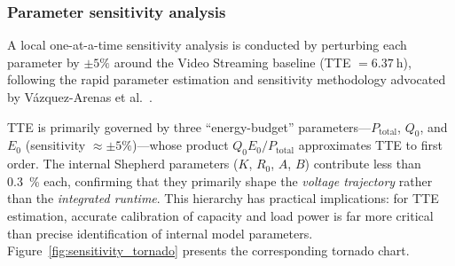 \documentclass[5p,times,number]{elsarticle}
\newcommand{\figref}[1]{\textcolor{supercolor}{Figure~\ref{#1}}}
\begin{document}
\subsubsection{Parameter sensitivity analysis}\label{sec:sensitivity}
A local one-at-a-time sensitivity analysis is conducted by perturbing each parameter by $\pm 5\%$ around the Video Streaming baseline (TTE $= \SI{6.37}{\hour}$), following the rapid parameter estimation and sensitivity methodology advocated by V\'{a}zquez-Arenas et al.~\cite{VazquezArenas2014ECM}.
\begin{table}[!tb]
\caption{Parameter sensitivity ($\pm 5\%$ perturbation, Video Streaming).}\label{tab:sensitivity}
\centering
{}
\end{table}
TTE is primarily governed by three ``energy-budget'' parameters---$P_{\mathrm{total}}$, $Q_0$, and $E_0$ (sensitivity $\approx \pm 5\%$)---whose product $Q_0 E_0 / P_{\mathrm{total}}$ approximates TTE to first order.
The internal Shepherd parameters ($K$, $R_0$, $A$, $B$) contribute less than \SI{0.3}{\percent} each, confirming that they primarily shape the \emph{voltage trajectory} rather than the \emph{integrated runtime}.
This hierarchy has practical implications: for TTE estimation, accurate calibration of capacity and load power is far more critical than precise identification of internal model parameters.
\figref{fig:sensitivity_tornado} presents the corresponding tornado chart.
\end{document}
